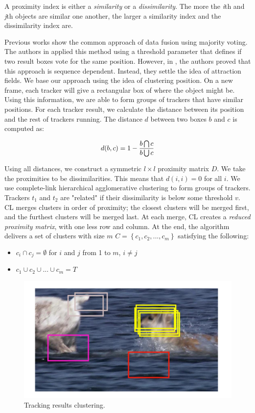 A proximity index is either a \textit{similarity} or a \textit{dissimilarity}. The more the \textit{i}th and \textit{j}th objects are similar one another, the larger a similarity index and the dissimilarity index are.

Previous works show the common approach of data fusion using majority voting. The authors in \cite{Bailer2013} applied this method using a threshold parameter that defines if two result boxes vote for the same position. However, in \cite{Bailer2014}, the authors proved that this approach is sequence dependent. Instead, they settle the idea of attraction fields. We base our approach using the idea of clustering position. On a new frame, each tracker will give a rectangular box of where the object might be. Using this information, we are able to form groups of trackers that have similar positions. For each tracker result, we calculate the distance between its position and the rest of trackers running. The distance $d$ between two boxes $b$ and $c$ is computed as:

\begin{equation}
\large
d(b,c) = 1 - \frac{b \bigcap c}{b \bigcup  c}
\end{equation}

Using all distances, we construct a symmetric $l \times l$ proximity matrix $D$. We take the proximities to be dissimilarities. This means that $d(i,i) = 0$ for all $i$. We use complete-link hierarchical agglomerative clustering to form groups of trackers. Trackers $t_1$ and $t_2$ are "related" if their dissimilarity is below some threshold $v$. CL merges clusters in order of proximity; the closest clusters will be merged first, and the furthest clusters will be merged last. At each merge, CL creates a \textit{reduced proximity matrix}, with one less row and column. At the end, the algorithm delivers a set of clusters with size $m$ $C = \left \{ c_1, c_2, ..., c_m \right \}$ satisfying the following:
\begin{itemize}
\item $c_i \cap c_j = \emptyset$ for $i$ and $j$ from 1 to $m$, $i \neq j$
\item $c_1 \cup c_2 \cup ... \cup c_m = T$
\end{itemize}

\begin{figure}[t!]
	\centering
		\includegraphics[width=0.65\linewidth, trim= 1cm 1cm 1cm 1cm, clip=true]{Figures/trackers_clustering.pdf}
	\caption{Tracking results clustering.}
	\label{fig::trackers_clustering}
\end{figure}

